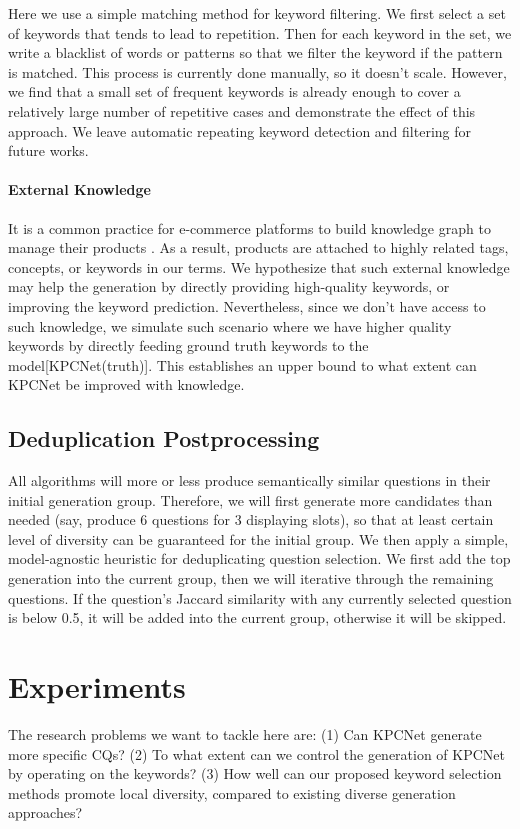 \documentclass[letterpaper]{article} %
\begin{document}
Here we use a simple matching method for keyword filtering. We first select a set of keywords that tends to lead to repetition. Then for each keyword in the set, we write a blacklist of words or patterns so that we filter the keyword if the pattern is matched. This process is currently done manually, so it doesn't scale. However, we find that a small set of frequent keywords is already enough to cover a relatively large number of repetitive cases and demonstrate the effect of this approach. We leave automatic repeating keyword detection and filtering for future works.  

\paragraph{External Knowledge} \label{sec:knowledge} It is a common practice for e-commerce platforms to build knowledge graph to manage their products \citep{dong2018challenges, luo2020alicoco}. As a result, products are attached to highly related tags, concepts, or keywords in our terms. We hypothesize that such external knowledge may help the generation by directly providing high-quality keywords, or improving the keyword prediction. Nevertheless, since we don't have access to such knowledge, we simulate such scenario where we have higher quality keywords by directly feeding ground truth keywords to the model[KPCNet(truth)]. This establishes an upper bound to what extent can KPCNet be improved with knowledge.

\subsection{Deduplication Postprocessing}
\label{sec:deduplicate}
All algorithms will more or less produce semantically similar questions in their initial generation group. Therefore, we will first generate more candidates than needed (say, produce 6 questions for 3 displaying slots), so that at least certain level of diversity can be guaranteed for the initial group. We then apply a simple, model-agnostic heuristic for deduplicating question selection. We first add the top generation into the current group, then we will iterative through the remaining questions. If the question's Jaccard similarity with any currently selected question is below 0.5, it will be added into the current group, otherwise it will be skipped. 

\section{Experiments}
\label{sec:experiments}
The research problems we want to tackle here are: 
(1) Can KPCNet generate more specific CQs? 
(2) To what extent can we control the generation of KPCNet by operating on the keywords? 
(3) How well can our proposed keyword selection methods promote local diversity, compared to existing diverse generation approaches?
\end{document}
